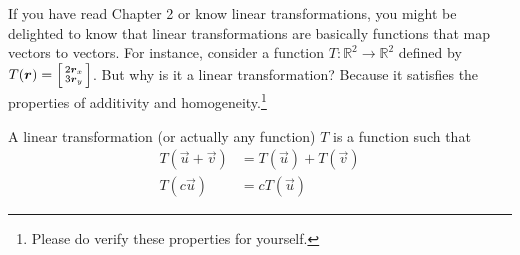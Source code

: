 If you have read Chapter 2 or know linear transformations, you might be delighted to know that linear transformations are basically functions that map vectors to vectors. For instance, consider a function \(T: \mathbb{R}^2 \to \mathbb{R}^2\) defined by \(T(\vec{r}) = \begin{bsmallmatrix}
  2\vec{r}_x \\
  3\vec{r}_y
\end{bsmallmatrix} \). But why is it a linear transformation? Because it satisfies the properties of additivity and homogeneity.\footnote{Please do verify these properties for yourself.}
\begin{definition}
  A linear transformation (or actually any function) \(T\) is a function such that
  \begin{align*}
    T(\vec{u} + \vec{v}) &= T(\vec{u}) + T(\vec{v}) \\
    T(c\vec{u}) &= cT(\vec{u}) 
  \end{align*}
\end{definition}

